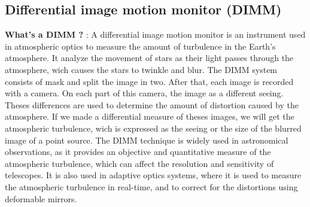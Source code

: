 \subsection{Differential image motion monitor (DIMM)}
\textbf{What's a DIMM ?} : \newline A differential image motion monitor is an instrument used in atmospheric optics to measure the amount of turbulence 
in the Earth's atmosphere. It analyze the movement of stars as their light passes through the atmosphere, wich causes the stars to twinkle and blur.
\newline
The DIMM system consists of mask and split the image in two. After that, each image is recorded with a camera. On each part of this camera, the image
as a different seeing. Theses differences are used to determine the amount of distortion caused by the atmosphere.\newline
If we made a differential measure of theses images, we will get the atmospheric turbulence, wich is expressed as the seeing or the size of the 
blurred image of a point source. \newline
The DIMM technique is widely used in astronomical observations, as it provides an objective and quantitative measure of the atmospheric turbulence, 
which can affect the resolution and sensitivity of telescopes. It is also used in adaptive optics systems, where it is used to measure the atmospheric 
turbulence in real-time, and to correct for the distortions using deformable mirrors.

